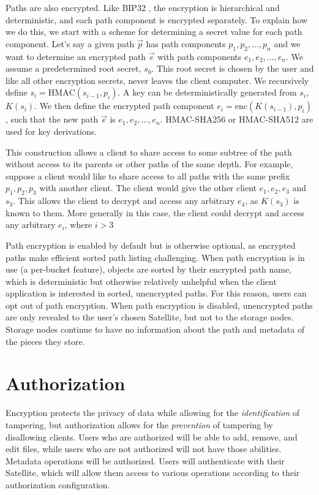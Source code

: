 \documentclass[8pt,fleqn,openany]{book}
\begin{document}
Paths are also encrypted. Like
BIP32 \cite{bip32}, the encryption is hierarchical and deterministic, and
each path component is encrypted separately. To explain how we do this,
we start with a scheme for determining a secret value for each path
component.
Let's say a given path $\vec{p}$ has path components $p_1, p_2, \ldots, p_n$
and we want to determine an encrypted path $\vec{e}$ with path components
$e_1, e_2, \ldots, e_n$.
We assume a predetermined root secret, $s_0$. This root secret is chosen
by the user and like all other encryption secrets, never leaves the client
computer. We recursively define
$s_i = \mbox{HMAC}(s_{i-1}, p_i)$.
A key can be deterministically generated from $s_i$, $K(s_i)$.
We then define the encrypted path component
$e_i = \mbox{enc}(K(s_{i-1}), p_i)$, such that the new path
$\vec{e}$ is $e_1, e_2, \ldots, e_n$.
HMAC-SHA256 or HMAC-SHA512 are used for key derivations.

This construction allows a client to share access to some subtree of the
path without access to its parents or other paths of the same depth. For
example, suppose a client would like to share access to all paths with the
same prefix $p_1, p_2, p_3$ with another client. The client would give the
other client $e_1, e_2, e_3$ and $s_3$. This allows the client to decrypt
and access any arbitrary $e_4$, as $K(s_3)$ is known to them. More generally
in this case, the client could decrypt and access any arbitrary $e_i$,
where $i > 3$

Path encryption is enabled by default but is otherwise optional, as encrypted
paths make efficient sorted path listing challenging.
When path encryption is in use (a per-bucket feature),
objects are sorted by their encrypted path name, which is deterministic
but otherwise relatively unhelpful
when the client application is interested in sorted, unencrypted paths.
For this reason, users can opt out of
path encryption. When path encryption is disabled, unencrypted paths
are only revealed to the user's chosen Satellite, but not to the storage
nodes. Storage nodes continue to have no information about the path and
metadata of the pieces they store.

\section{Authorization}\label{sec:concrete-authorization}

Encryption protects the privacy of data while allowing for the {\em identification}
of tampering, but authorization allows for the {\em prevention} of tampering by
disallowing clients. Users who are authorized will be able to add, remove,
and edit files, while users who are not authorized will not have those abilities.
Metadata operations will be authorized. Users will authenticate with
their Satellite, which will allow them access to various operations according
to their authorization configuration.
\end{document}
